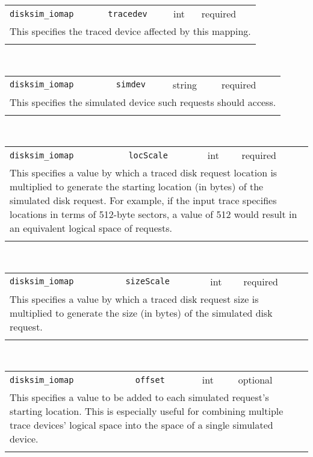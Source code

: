 \noindent 
\begin{tabular}{|p{\lpmodwidth}|p{\lpnamewidth}|p{0.5in}|p{0.5in}|}
\cline{1-4}
\texttt{disksim\_iomap} & \texttt{tracedev} & int & required \\ 
\cline{1-4}
\multicolumn{4}{|p{6in}|}{
This specifies the traced device affected by this mapping.
}\\ 
\cline{1-4}
\multicolumn{4}{p{5in}}{}\\
\end{tabular}\\ 
\noindent 
\begin{tabular}{|p{\lpmodwidth}|p{\lpnamewidth}|p{0.5in}|p{0.5in}|}
\cline{1-4}
\texttt{disksim\_iomap} & \texttt{simdev} & string & required \\ 
\cline{1-4}
\multicolumn{4}{|p{6in}|}{
This specifies the simulated device such requests should access.
}\\ 
\cline{1-4}
\multicolumn{4}{p{5in}}{}\\
\end{tabular}\\ 
\noindent 
\begin{tabular}{|p{\lpmodwidth}|p{\lpnamewidth}|p{0.5in}|p{0.5in}|}
\cline{1-4}
\texttt{disksim\_iomap} & \texttt{locScale} & int & required \\ 
\cline{1-4}
\multicolumn{4}{|p{6in}|}{
This specifies a value by which a traced disk request location is multiplied to
generate the starting location (in bytes) of the simulated disk
request. For example, if the input trace specifies locations in terms
of 512-byte sectors, a value of 512 would result in an equivalent
logical space of requests.
}\\ 
\cline{1-4}
\multicolumn{4}{p{5in}}{}\\
\end{tabular}\\ 
\noindent 
\begin{tabular}{|p{\lpmodwidth}|p{\lpnamewidth}|p{0.5in}|p{0.5in}|}
\cline{1-4}
\texttt{disksim\_iomap} & \texttt{sizeScale} & int & required \\ 
\cline{1-4}
\multicolumn{4}{|p{6in}|}{
This specifies a value by which a traced disk request size is
multiplied to generate the size (in bytes) of the simulated disk
request.
}\\ 
\cline{1-4}
\multicolumn{4}{p{5in}}{}\\
\end{tabular}\\ 
\noindent 
\begin{tabular}{|p{\lpmodwidth}|p{\lpnamewidth}|p{0.5in}|p{0.5in}|}
\cline{1-4}
\texttt{disksim\_iomap} & \texttt{offset} & int & optional \\ 
\cline{1-4}
\multicolumn{4}{|p{6in}|}{
This specifies a value to be added to each simulated request's
starting location. This is especially useful for combining multiple
trace devices' logical space into the space of a single simulated
device.
}\\ 
\cline{1-4}
\multicolumn{4}{p{5in}}{}\\
\end{tabular}\\ 
